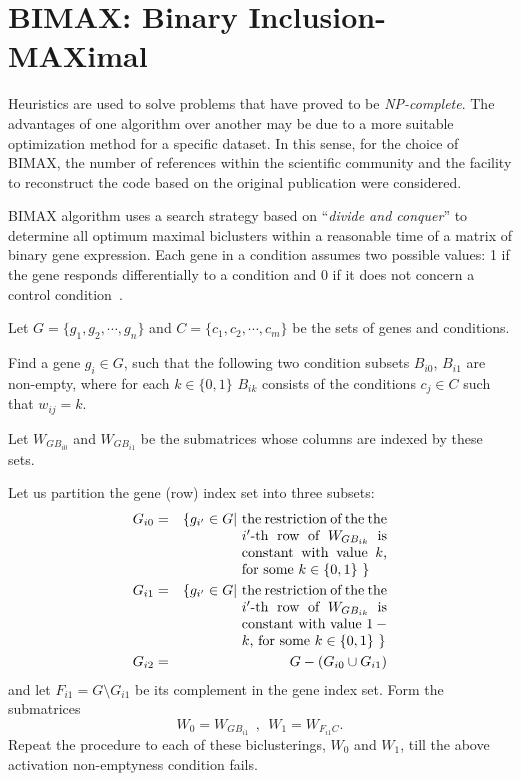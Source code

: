\documentclass[a4paper,conference]{IEEEtran}
\begin{document}
\section{BIMAX: Binary Inclusion-MAXimal}\label{sc.4}

Heuristics are used to solve problems that have proved to be \textit{NP-complete}. The advantages of one algorithm over another may be due to a more suitable optimization method for a specific dataset. In this sense, for the choice of BIMAX, the number of references within the scientific community and the facility to reconstruct the code based on the original publication were considered.

BIMAX algorithm uses a search strategy based on ``\textit{divide and conquer}'' to determine all optimum maximal biclusters within a reasonable time of a matrix of binary gene expression. Each gene in a condition assumes two possible values: 1 if the gene responds differentially to a condition and 0 if it does not concern a control condition~\cite{prelic2006systematic}.

Let  $G=\{g_1, g_2, \cdots, g_n\}$ and $C=\{c_1, c_2, \cdots, c_m\}$ be the sets of genes and conditions. 

Find a gene $g_i\in G$, such that the following two condition subsets $B_{i0}$, $B_{i1}$ are non-empty,  where for each $k\in\{0,1\}$ $B_{ik}$ consists of the conditions $c_j\in C$ such that $w_{ij}=k$. 

Let $W_{GB_{i0}}$ and $W_{GB_{i1}}$ be the submatrices whose columns are indexed by these sets.  

Let us partition the gene (row) index set into three subsets:
\begin{eqnarray*}
 G_{i0} &=& \{g_{i'}\in G|\ \mbox{\begin{minipage}[t]{.3\textwidth}
 the restriction of the the $i'$-th row of $W_{GB_{ik}}$ is constant with value $k$, for some $k\in\{0,1\}$
 $\}$
\end{minipage}} \\ 
 G_{i1} &=& \{g_{i'}\in G|\ \mbox{\begin{minipage}[t]{.3\textwidth}
 the restriction of the the $i'$-th row of $W_{GB_{ik}}$ is constant with value $1-k$, for some $k\in\{0,1\}$
 $\}$
\end{minipage}} \\ 
 G_{i2} &=& G-(G_{i0} \cup G_{i1} )
\end{eqnarray*}
and let $F_{i1} = G \setminus  G_{i1}$ be its complement in the gene index set. Form the submatrices
$$W_{0} = W_{GB_{i1}} \ \  , \ \   W_{1} = W_{F_{i1}C}.$$
Repeat the procedure to each of these biclusterings, $W_0$ and $W_1$, till the above activation non-emptyness condition fails.
\end{document}
